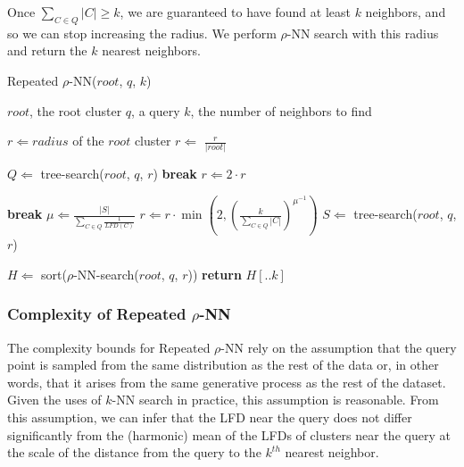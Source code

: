 Once $\sum_{C \in Q} |C| \geq k$, we are guaranteed to have found at least $k$ neighbors, and so we can stop increasing the radius.
We perform $\rho$-NN search with this radius and return the $k$ nearest neighbors.

\begin{algorithm} %
    \caption{Repeated $\rho$-NN($root$, $q$, $k$)} %
    \label{alg:methods:repeated-rnn} %
    \begin{algorithmic} %
        \REQUIRE $root$, the root cluster
        \REQUIRE $q$, a query
        \REQUIRE $k$, the number of neighbors to find

        \STATE $r \Leftarrow radius$ of the $root$ cluster
        \STATE $r \Leftarrow$ $\frac{r}{|root|}$

        \ALOOP{}
            \STATE $Q \Leftarrow$ tree-search($root$, $q$, $r$)
                \STATE \textbf{break}
            \ENDIF
            \STATE $r \Leftarrow 2 \cdot r$
        \ENDALOOP

        \ALOOP{}
                \STATE \textbf{break}
            \ENDIF
            \STATE $\mu \Leftarrow \frac{|S|}{\sum_{C \in Q} \frac{1}{LFD(C)}}$
            \STATE $r \Leftarrow r \cdot \min \left( 2, \left( {\frac{k}{\sum_{C \in Q} |C|}} \right)^{\mu^{-1}} \right)$
            \STATE $S \Leftarrow$ tree-search($root$, $q$, $r$)
        \ENDLOOP

        \STATE $H \Leftarrow$ sort($\rho$-NN-search($root$, $q$, $r$))
        \STATE \textbf{return} $H[.. k]$
    \end{algorithmic}
\end{algorithm}


\subsubsection{Complexity of Repeated \texorpdfstring{$\rho$}{p}-NN}
\label{sec:methods:knn-search:repeated-rnn-complexity}

The complexity bounds for Repeated $\rho$-NN rely on the assumption that the query point is sampled from the same distribution as the rest of the data or, in other words, that it arises from the same generative process as the rest of the dataset.
Given the uses of $k$-NN search in practice, this assumption is reasonable.
From this assumption, we can infer that the LFD near the query does not differ significantly from the (harmonic) mean of the LFDs of clusters near the query at the scale of the distance from the query to the $k^{th}$ nearest neighbor.

